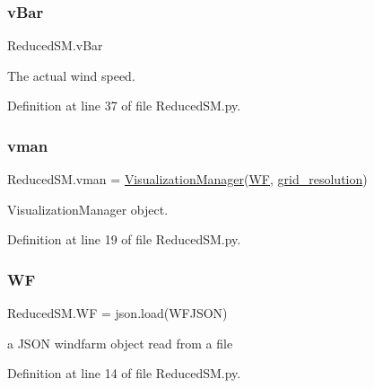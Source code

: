 \mbox{\label{namespace_reduced_s_m_a0e80246040e2942e9ccee8ec8ee7313c}} 
\subsubsection{\texorpdfstring{v\+Bar}{vBar}}
{\footnotesize\ttfamily Reduced\+S\+M.\+v\+Bar}



The actual wind speed. 



Definition at line 37 of file Reduced\+S\+M.\+py.

\mbox{\label{namespace_reduced_s_m_aea7c8ee42c44fbc9f8c3702567edc840}} 
\subsubsection{\texorpdfstring{vman}{vman}}
{\footnotesize\ttfamily Reduced\+S\+M.\+vman = \mbox{\hyperlink{classvisualization__manager___d_j_1_1_visualization_manager}{Visualization\+Manager}}(\mbox{\hyperlink{namespace_reduced_s_m_ad2cb878a0bc5ba18176fff5ab9b02dc3}{WF}}, \mbox{\hyperlink{namespace_reduced_s_m_ac73e3bc6b17648d508dd822d76929524}{grid\+\_\+resolution}})}



Visualization\+Manager object. 



Definition at line 19 of file Reduced\+S\+M.\+py.

\mbox{\label{namespace_reduced_s_m_ad2cb878a0bc5ba18176fff5ab9b02dc3}} 
\subsubsection{\texorpdfstring{WF}{WF}}
{\footnotesize\ttfamily Reduced\+S\+M.\+WF = json.\+load(W\+F\+J\+S\+ON)}



a J\+S\+ON windfarm object read from a file 



Definition at line 14 of file Reduced\+S\+M.\+py.

